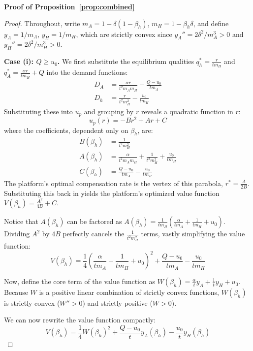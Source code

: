 \documentclass[mnsc,nonblindrev]{informs3_NoOR}
\begin{document}
\noindent\textbf{Proof of Proposition~\ref{prop:combined}}
\begin{proof}
Throughout, write $m_A = 1 - \delta(1-\beta_h)$, $m_H = 1 - \beta_h\delta$, and define $y_A = 1/m_A$, $y_H = 1/m_H$, which are strictly convex since $y_A'' = 2\delta^2/m_A^3 > 0$ and $y_H'' = 2\delta^2/m_H^3 > 0$.
 
\medskip\noindent\textbf{Case (i): $Q \ge u_0$.} We first substitute the equilibrium qualities $q_h^* = \frac{r}{tm_H}$ and $q_A^* = \frac{\alpha r}{tm_H} + Q$ into the demand functions:
\begin{align*}
D_A &= \frac{\alpha r}{t^2 m_A m_H} + \frac{Q-u_0}{t m_A} \\
D_h &= \frac{r}{t^2 m_H^2} - \frac{u_0}{t m_H}
\end{align*}
Substituting these into $u_p$ and grouping by $r$ reveals a quadratic function in $r$:
\begin{equation}
u_p(r) = -B r^2 + A r + C
\end{equation}
where the coefficients, dependent only on $\beta_h$, are:
\begin{align*}
B(\beta_h) &= \frac{1}{t^2 m_H^2} \\
A(\beta_h) &= \frac{\alpha}{t^2 m_A m_H} + \frac{1}{t^2 m_H^2} + \frac{u_0}{t m_H} \\
C(\beta_h) &= \frac{Q-u_0}{t m_A} - \frac{u_0}{t m_H}
\end{align*}
The platform's optimal compensation rate is the vertex of this parabola, $r^* = \frac{A}{2B}$. Substituting this back in yields the platform's optimized value function $V(\beta_h) = \frac{A^2}{4B} + C$. 

Notice that $A(\beta_h)$ can be factored as $A(\beta_h) = \frac{1}{t m_H} \left( \frac{\alpha}{t m_A} + \frac{1}{t m_H} + u_0 \right)$. Dividing $A^2$ by $4B$ perfectly cancels the $\frac{1}{t^2 m_H^2}$ terms, vastly simplifying the value function:
\begin{equation}
V(\beta_h) = \frac{1}{4} \left( \frac{\alpha}{t m_A} + \frac{1}{t m_H} + u_0 \right)^2 + \frac{Q-u_0}{t m_A} - \frac{u_0}{t m_H}
\end{equation}

Now, define the core term of the value function as $W(\beta_h) = \frac{\alpha}{t} y_A + \frac{1}{t} y_H + u_0$. Because $W$ is a positive linear combination of strictly convex functions, $W(\beta_h)$ is strictly convex ($W'' > 0$) and strictly positive ($W > 0$).

We can now rewrite the value function compactly:
\begin{equation}
V(\beta_h) = \frac{1}{4} W(\beta_h)^2 + \frac{Q-u_0}{t} y_A(\beta_h) - \frac{u_0}{t} y_H(\beta_h)
\end{equation}


\end{proof}
\end{document}
